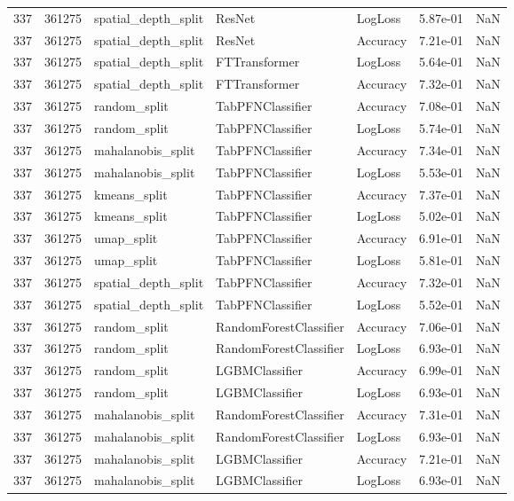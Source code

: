 \begin{tabular}{rrlllrr}
337 & 361275 & spatial\_depth\_split & ResNet & LogLoss & 5.87e-01 & NaN \\
337 & 361275 & spatial\_depth\_split & ResNet & Accuracy & 7.21e-01 & NaN \\
337 & 361275 & spatial\_depth\_split & FTTransformer & LogLoss & 5.64e-01 & NaN \\
337 & 361275 & spatial\_depth\_split & FTTransformer & Accuracy & 7.32e-01 & NaN \\
337 & 361275 & random\_split & TabPFNClassifier & Accuracy & 7.08e-01 & NaN \\
337 & 361275 & random\_split & TabPFNClassifier & LogLoss & 5.74e-01 & NaN \\
337 & 361275 & mahalanobis\_split & TabPFNClassifier & Accuracy & 7.34e-01 & NaN \\
337 & 361275 & mahalanobis\_split & TabPFNClassifier & LogLoss & 5.53e-01 & NaN \\
337 & 361275 & kmeans\_split & TabPFNClassifier & Accuracy & 7.37e-01 & NaN \\
337 & 361275 & kmeans\_split & TabPFNClassifier & LogLoss & 5.02e-01 & NaN \\
337 & 361275 & umap\_split & TabPFNClassifier & Accuracy & 6.91e-01 & NaN \\
337 & 361275 & umap\_split & TabPFNClassifier & LogLoss & 5.81e-01 & NaN \\
337 & 361275 & spatial\_depth\_split & TabPFNClassifier & Accuracy & 7.32e-01 & NaN \\
337 & 361275 & spatial\_depth\_split & TabPFNClassifier & LogLoss & 5.52e-01 & NaN \\
337 & 361275 & random\_split & RandomForestClassifier & Accuracy & 7.06e-01 & NaN \\
337 & 361275 & random\_split & RandomForestClassifier & LogLoss & 6.93e-01 & NaN \\
337 & 361275 & random\_split & LGBMClassifier & Accuracy & 6.99e-01 & NaN \\
337 & 361275 & random\_split & LGBMClassifier & LogLoss & 6.93e-01 & NaN \\
337 & 361275 & mahalanobis\_split & RandomForestClassifier & Accuracy & 7.31e-01 & NaN \\
337 & 361275 & mahalanobis\_split & RandomForestClassifier & LogLoss & 6.93e-01 & NaN \\
337 & 361275 & mahalanobis\_split & LGBMClassifier & Accuracy & 7.21e-01 & NaN \\
337 & 361275 & mahalanobis\_split & LGBMClassifier & LogLoss & 6.93e-01 & NaN \\

\end{tabular}
